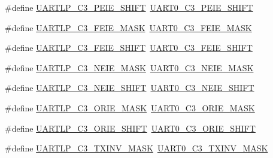 \begin{DoxyCompactItemize}
\item 
\#define \hyperlink{group___backward___compatibility___symbols_gacaf37722e62340c548104406df0bcc64}{U\+A\+R\+T\+L\+P\+\_\+\+C3\+\_\+\+P\+E\+I\+E\+\_\+\+S\+H\+I\+FT}~\hyperlink{group___u_a_r_t0___register___masks_gafce96820de4fce25539d9bc3f0bee376}{U\+A\+R\+T0\+\_\+\+C3\+\_\+\+P\+E\+I\+E\+\_\+\+S\+H\+I\+FT}
\item 
\#define \hyperlink{group___backward___compatibility___symbols_ga06e90c952858ab6b2a6e8fec451fed4a}{U\+A\+R\+T\+L\+P\+\_\+\+C3\+\_\+\+F\+E\+I\+E\+\_\+\+M\+A\+SK}~\hyperlink{group___u_a_r_t0___register___masks_gaa01da5d1e8dc6f89dc58c0104beba4b2}{U\+A\+R\+T0\+\_\+\+C3\+\_\+\+F\+E\+I\+E\+\_\+\+M\+A\+SK}
\item 
\#define \hyperlink{group___backward___compatibility___symbols_ga47332e2095915eede18d8b2e44bc08d3}{U\+A\+R\+T\+L\+P\+\_\+\+C3\+\_\+\+F\+E\+I\+E\+\_\+\+S\+H\+I\+FT}~\hyperlink{group___u_a_r_t0___register___masks_gaafe99b12e9534395e8c36a86dd3d2e98}{U\+A\+R\+T0\+\_\+\+C3\+\_\+\+F\+E\+I\+E\+\_\+\+S\+H\+I\+FT}
\item 
\#define \hyperlink{group___backward___compatibility___symbols_ga5b1c0f5de0179b86f7efd474133a5838}{U\+A\+R\+T\+L\+P\+\_\+\+C3\+\_\+\+N\+E\+I\+E\+\_\+\+M\+A\+SK}~\hyperlink{group___u_a_r_t0___register___masks_ga44fe8fd48c0fac9eda6b76bba6174f45}{U\+A\+R\+T0\+\_\+\+C3\+\_\+\+N\+E\+I\+E\+\_\+\+M\+A\+SK}
\item 
\#define \hyperlink{group___backward___compatibility___symbols_gaa8aa79a21c751f77d27f76e62753bf9f}{U\+A\+R\+T\+L\+P\+\_\+\+C3\+\_\+\+N\+E\+I\+E\+\_\+\+S\+H\+I\+FT}~\hyperlink{group___u_a_r_t0___register___masks_ga60c064efad2eef2bc2ebebe2c0ffd1b9}{U\+A\+R\+T0\+\_\+\+C3\+\_\+\+N\+E\+I\+E\+\_\+\+S\+H\+I\+FT}
\item 
\#define \hyperlink{group___backward___compatibility___symbols_gaa9293d3cac47a88e5be264b21e110bfd}{U\+A\+R\+T\+L\+P\+\_\+\+C3\+\_\+\+O\+R\+I\+E\+\_\+\+M\+A\+SK}~\hyperlink{group___u_a_r_t0___register___masks_ga728e7b520b1f4122c701a1fec02dce60}{U\+A\+R\+T0\+\_\+\+C3\+\_\+\+O\+R\+I\+E\+\_\+\+M\+A\+SK}
\item 
\#define \hyperlink{group___backward___compatibility___symbols_gad69f41c3e7e8bd2086748eb86a967220}{U\+A\+R\+T\+L\+P\+\_\+\+C3\+\_\+\+O\+R\+I\+E\+\_\+\+S\+H\+I\+FT}~\hyperlink{group___u_a_r_t0___register___masks_ga01878e41bfd1652bb4c6e4a27a11dd68}{U\+A\+R\+T0\+\_\+\+C3\+\_\+\+O\+R\+I\+E\+\_\+\+S\+H\+I\+FT}
\item 
\#define \hyperlink{group___backward___compatibility___symbols_gad07163dc482ca87cdab056c680c081c2}{U\+A\+R\+T\+L\+P\+\_\+\+C3\+\_\+\+T\+X\+I\+N\+V\+\_\+\+M\+A\+SK}~\hyperlink{group___u_a_r_t0___register___masks_gaead58bbfecceef15fc563180b19dea48}{U\+A\+R\+T0\+\_\+\+C3\+\_\+\+T\+X\+I\+N\+V\+\_\+\+M\+A\+SK}

\end{DoxyCompactItemize}
